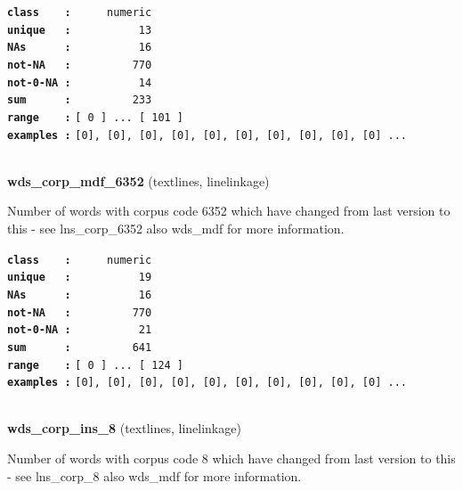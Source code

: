 \documentclass[]{article}
\begin{document}
\textbf{\texttt{class\ \ \ \ :}} \texttt{~~~~~numeric}\\
\textbf{\texttt{unique\ \ \ :}} \texttt{~~~~~~~~~~13}\\
\textbf{\texttt{NAs\ \ \ \ \ \ :}} \texttt{~~~~~~~~~~16}\\
\textbf{\texttt{not-NA\ \ \ :}} \texttt{~~~~~~~~~770}\\
\textbf{\texttt{not-0-NA\ :}} \texttt{~~~~~~~~~~14}\\
\textbf{\texttt{sum\ \ \ \ \ \ :}} \texttt{~~~~~~~~~233}\\
\textbf{\texttt{range\ \ \ \ :}}
\texttt{{[}\ 0\ {]}\ ...\ {[}\ 101\ {]}}\\
\textbf{\texttt{examples\ :}}
\texttt{{[}0{]},\ {[}0{]},\ {[}0{]},\ {[}0{]},\ {[}0{]},\ {[}0{]},\ {[}0{]},\ {[}0{]},\ {[}0{]},\ {[}0{]}\ ...}\\

~

\textbf{wds\_corp\_mdf\_6352} (textlines, linelinkage)

Number of words with corpus code 6352 which have changed from last
version to this - see lns\_corp\_6352 also wds\_mdf for more
information.

\textbf{\texttt{class\ \ \ \ :}} \texttt{~~~~~numeric}\\
\textbf{\texttt{unique\ \ \ :}} \texttt{~~~~~~~~~~19}\\
\textbf{\texttt{NAs\ \ \ \ \ \ :}} \texttt{~~~~~~~~~~16}\\
\textbf{\texttt{not-NA\ \ \ :}} \texttt{~~~~~~~~~770}\\
\textbf{\texttt{not-0-NA\ :}} \texttt{~~~~~~~~~~21}\\
\textbf{\texttt{sum\ \ \ \ \ \ :}} \texttt{~~~~~~~~~641}\\
\textbf{\texttt{range\ \ \ \ :}}
\texttt{{[}\ 0\ {]}\ ...\ {[}\ 124\ {]}}\\
\textbf{\texttt{examples\ :}}
\texttt{{[}0{]},\ {[}0{]},\ {[}0{]},\ {[}0{]},\ {[}0{]},\ {[}0{]},\ {[}0{]},\ {[}0{]},\ {[}0{]},\ {[}0{]}\ ...}\\

~

\textbf{wds\_corp\_ins\_8} (textlines, linelinkage)

Number of words with corpus code 8 which have changed from last version
to this - see lns\_corp\_8 also wds\_mdf for more information.
\end{document}

